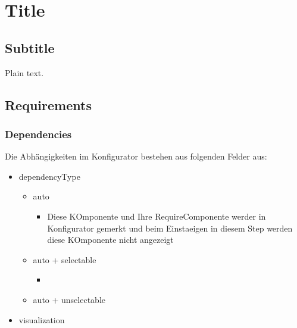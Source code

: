 \documentclass{article}
\begin{document}
\section{Title}

\subsection{Subtitle}

Plain text.

\subsection{Requirements}

\subsubsection{Dependencies}

Die Abhängigkeiten im Konfigurator bestehen aus folgenden Felder aus:

\begin{itemize} 
\item dependencyType
\begin{itemize}
  \item auto 
    \begin{itemize}
      \item Diese KOmponente und Ihre RequireComponente werder in Konfigurator
      gemerkt und beim Einstaeigen in diesem Step werden diese KOmponente nicht
      angezeigt
    
    \end{itemize}
  \item auto + selectable
  \begin{itemize}
    \item 
    
  \end{itemize}
  \item auto + unselectable
\end{itemize}
\item visualization

\end{itemize}
\end{document}
